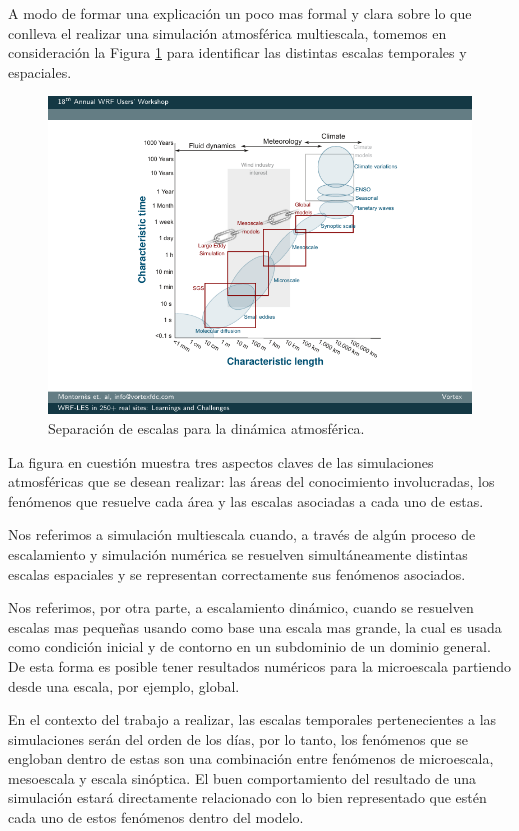 A modo de formar una explicación un poco mas formal y clara sobre lo que conlleva el realizar una simulación atmosférica multiescala, tomemos en consideración la Figura \ref{fig:02_escalas} para identificar las distintas escalas temporales y espaciales.

\begin{figure}[h!]
	\centering
	\includegraphics[width=0.85\linewidth,trim={2.6cm 1.4cm 1.5cm 0.8cm},clip]{Imagenes/02/escalas}
	\caption{Separación de escalas para la dinámica atmosférica.}
	\label{fig:02_escalas}
\end{figure}

La figura en cuestión muestra tres aspectos claves de las simulaciones atmosféricas que se desean realizar: las áreas del conocimiento involucradas, los fenómenos que resuelve cada área y las escalas asociadas a cada uno de estas.

Nos referimos a simulación multiescala cuando, a través de algún proceso de escalamiento y simulación numérica se resuelven simultáneamente distintas escalas espaciales y se representan correctamente sus fenómenos asociados.
 
Nos referimos, por otra parte, a escalamiento dinámico, cuando se resuelven escalas mas pequeñas usando como base una escala mas grande, la cual es usada como condición inicial y de contorno en un subdominio de un dominio general. De esta forma es posible tener resultados numéricos para la microescala partiendo desde una escala, por ejemplo, global. 

En el contexto del trabajo a realizar, las escalas temporales pertenecientes a las simulaciones serán del orden de los días, por lo tanto, los fenómenos que se engloban dentro de estas son una combinación entre fenómenos de microescala, mesoescala y escala sinóptica. El buen comportamiento del resultado de una simulación estará directamente relacionado con lo bien representado que estén cada uno de estos fenómenos dentro del modelo.

